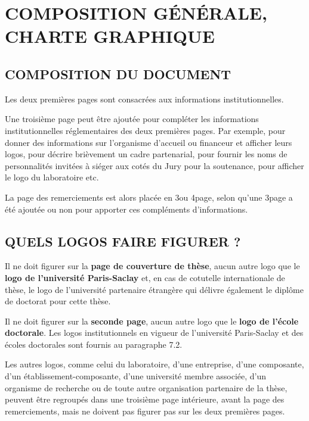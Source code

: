 \documentclass[french,12pt,a4paper]{book}
\begin{document}
\chapter{COMPOSITION GÉNÉRALE, CHARTE GRAPHIQUE}
\section{COMPOSITION DU DOCUMENT}
Les deux premières pages sont consacrées aux informations institutionnelles. \\ \par
Une troisième page peut être ajoutée pour compléter les informations institutionnelles réglementaires des deux premières pages. Par exemple, pour donner des informations sur l’organisme d’accueil ou financeur et afficher leurs logos, pour décrire brièvement un cadre partenarial, pour fournir les noms de personnalités invitées à siéger aux cotés du Jury pour la soutenance, pour afficher le logo du laboratoire etc. \\ \par 
La page des remerciements est alors placée en 3\ieme ou 4\ieme page, selon qu’une 3\ieme page a été ajoutée ou non pour apporter ces compléments d’informations.
\section{QUELS LOGOS FAIRE FIGURER ?}
Il ne doit figurer sur la \textbf{page de couverture de thèse}, aucun autre logo que le \textbf{logo de l’université Paris-Saclay} et, en cas de cotutelle internationale de thèse, le logo de l’université partenaire étrangère qui délivre également le diplôme de doctorat pour cette thèse. \\ \par
Il ne doit figurer sur la \textbf{seconde page}, aucun autre logo que le \textbf{logo de l’école doctorale}.
Les logos institutionnels en vigueur de l’université Paris-Saclay et des écoles doctorales sont fournis au paragraphe 7.2.\\ \par
Les autres logos, comme celui du laboratoire, d’une entreprise, d’une composante, d’un établissement-composante, d’une université membre associée, d’un organisme de recherche ou de toute autre organisation partenaire de la thèse, peuvent être regroupés dans une troisième page intérieure, avant la page des remerciements, mais ne doivent pas figurer pas sur les deux premières pages.
\end{document}
